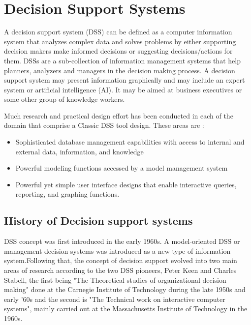 \chapter{Decision Support Systems}
\renewcommand\textbullet{\ensuremath{\bullet}}
\label{ChapterTwo}
\indent A decision support system (DSS) can be defined as a computer information system that analyzes complex data and solves problems by either supporting decision makers make informed decisions or suggesting decisions/actions for them.\cite{shim2002past} DSSs are a sub-collection of information management systems that help planners, analyzers and managers in the decision making process.\cite{khodashahri2013decision} A decision support system may present information graphically and may include an expert system or artificial intelligence (AI). It may be aimed at business executives or some other group of knowledge workers.

\indent Much research and practical design effort has been conducted in each of the domain that comprise a Classic DSS tool design. These areas are :
\begin{itemize}
	\item Sophisticated database management capabilities with access to internal and external data, information, and knowledge
	\item Powerful modeling functions accessed by a model management system
	\item Powerful yet simple user interface designs that enable interactive queries, reporting, and graphing functions.
\end{itemize}
\section{History of Decision support systems}
\label{sec:HistoryOfDecisionSupportSystems}
\indent DSS concept was first introduced in the early 1960s.\cite{power2007brief} A model-oriented DSS or management decision systems was introduced as a new type of information system.Following that, the concept of decision support evolved into two main areas of research according to the two DSS pioneers, Peter Keen and Charles Stabell, the first being "The Theoretical studies of organizational decision making" done at the Carnegie Institute of Technology during the late 1950s and early '60s and the second is "The Technical work on interactive computer systems", mainly carried out at the Massachusetts Institute of Technology in the 1960s.\cite{power2007brief}\cite{shim2002past}

